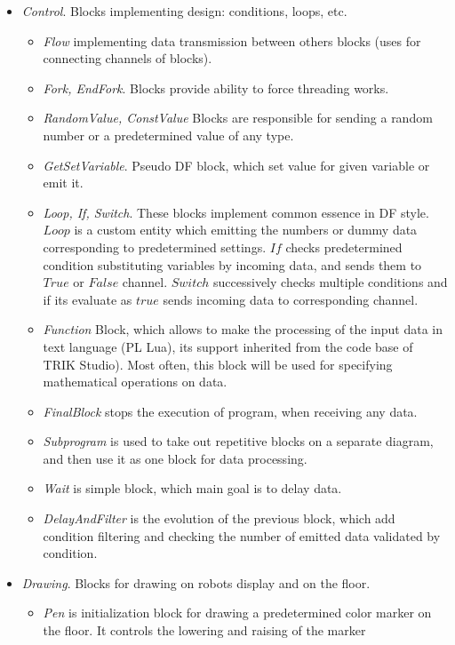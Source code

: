 \documentclass[conference,compsoc]{IEEEtran}
\begin{document}
\begin{itemize}
\item \textit{Control}. Blocks implementing design: conditions, loops, etc.
\begin{itemize}
\item \textit{Flow} implementing data transmission between others blocks (uses for connecting channels of blocks).
\item \textit{Fork, EndFork}. Blocks provide ability to force threading works.
\item \textit{RandomValue, ConstValue} Blocks are responsible for sending a random number or a predetermined value of any type.
\item \textit{GetSetVariable}. Pseudo DF block, which set value for given variable or emit it.
\item \textit{Loop, If, Switch}. These blocks implement common essence in DF style. $Loop$ is a custom entity which emitting the numbers or dummy data corresponding to predetermined settings. $If$ checks predetermined condition substituting variables by incoming data, and sends them to $True$ or $False$ channel. $Switch$ successively checks multiple conditions and if its evaluate as $true$ sends incoming data to corresponding channel.  	
\item \textit{Function} Block, which allows to make the processing of the input data in text language (PL Lua\cite{lua}), its support inherited from the code base of TRIK Studio). Most often, this block will be used for specifying mathematical operations on data.
\item \textit{FinalBlock} stops the execution of program, when receiving any data. 
\item \textit{Subprogram} is used to take out repetitive blocks on a separate diagram, and then use it as one block for data processing.
\item \textit{Wait} is simple block, which main goal is to delay data.
\item \textit{DelayAndFilter} is the evolution of the previous block, which add condition filtering and checking the number of emitted data validated by condition.
\end{itemize} 
\item \textit{Drawing}. Blocks for drawing on robots display and on the floor.
\begin{itemize}
\item \textit{Pen} is initialization block for drawing a predetermined color marker on the floor.  It controls the lowering and raising of the marker

\end{itemize}
\end{itemize}
\end{document}
